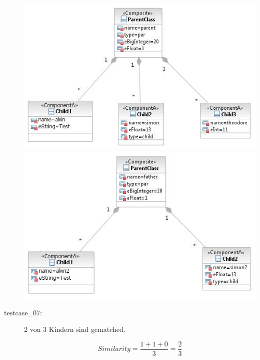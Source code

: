\documentclass[a4paper]{article}
\begin{document}
\begin{description}
	\includegraphics[scale=0.5]{CompareChildrenMatchedOrSimilarTestScreens/Testcase05model1.jpeg}
	\includegraphics[scale=0.5]{CompareChildrenMatchedOrSimilarTestScreens/Testcase05model2.jpeg}

  \item[testcase\_07:]  2 von 3 Kindern sind gematched.
    
   \begin{equation*}
   Similarity = \frac{1+1+0}{3}=\frac{2}{3}
   \end{equation*}
    

\end{description}
\end{document}
